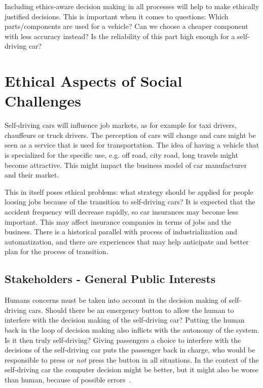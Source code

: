 Including ethics-aware decision making in all processes will help to make ethically justified decisions. This is important when it comes to questions: Which parts/components are used for a vehicle? Can we choose a cheaper component with less accuracy instead? Is the reliability of this part high enough for a self-driving car?



\section{Ethical Aspects of Social Challenges}
\label{sec:EAofNONTC}

\label{sec:EAofNONTC:SocialChallenges}

Self-driving cars will influence job markets, as for example for taxi drivers, chauffeurs or truck drivers. The perception of cars will change and cars might be seen as a service that is used for transportation. The idea of having a vehicle that is specialized for the specific use, e.g. off road, city road, long travels might become attractive. This might impact the business model of car manufacturer and their market.

This in itself poses ethical problems: what strategy should be applied for people loosing jobs because of the transition to self-driving cars? It is expected that the accident frequency will decrease rapidly, so car insurances may become less important. This may affect insurance companies in terms of jobs and the business. There is a historical parallel with process of industrialization and automatization, and there are experiences that may help anticipate and better plan for the process of transition.


\subsection{Stakeholders - General Public Interests}
\label{sec:EAofNONTC:Stakeholders}

Humans concerns must be taken into account in the decision making of self-driving cars.
Should there be an emergency button to allow the human to interfere with the decision making of the self-driving car? %
Putting the human back in the loop of decision making also inflicts with the autonomy of the system. Is it then truly self-driving? Giving passengers a choice to interfere with the decisions of the self-driving car puts the passenger back in charge, who would be responsible to press or \textit{not} press the button in all situations. %
In the context of the self-driving car the computer decision might be better, but it might also be worse than human, because of possible errors~\cite{Eckstein2016}.

